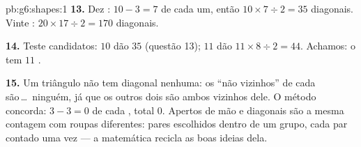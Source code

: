 \begin{solution}{pb:g6:shapes:1}
\textbf{13.} Dez : $10 - 3 = 7$ de cada um, então
$10 \times 7 \div 2 = 35$ diagonais. Vinte :
$20 \times 17 \div 2 = 170$ diagonais.

\textbf{14.} Teste candidatos: $10$  dão $35$ (questão 13);
$11$  dão $11 \times 8 \div 2 = 44$. Achamos: o  tem
$11$ .

\textbf{15.} Um triângulo não tem diagonal nenhuma: os
``não vizinhos'' de cada  são\,\dots\ ninguém, já que os outros
dois  são ambos vizinhos dele. O método concorda: $3 - 3 = 0$
de cada , total $0$. Apertos de mão e diagonais são a mesma
contagem com roupas diferentes: pares escolhidos dentro de um grupo,
cada par contado uma vez --- a matemática recicla as boas ideias dela.
\end{solution}
